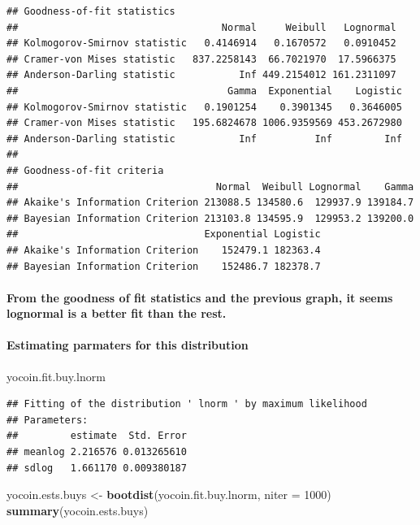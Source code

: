 \documentclass[]{article}
\newenvironment{Shaded}{\begin{snugshade}}{\end{snugshade}}
\newcommand{\KeywordTok}[1]{\textcolor[rgb]{0.13,0.29,0.53}{\textbf{#1}}}
\newcommand{\DataTypeTok}[1]{\textcolor[rgb]{0.13,0.29,0.53}{#1}}
\newcommand{\DecValTok}[1]{\textcolor[rgb]{0.00,0.00,0.81}{#1}}
\newcommand{\StringTok}[1]{\textcolor[rgb]{0.31,0.60,0.02}{#1}}
\newcommand{\NormalTok}[1]{#1}
\let\oldparagraph\paragraph
\renewcommand{\paragraph}[1]{\oldparagraph{#1}\mbox{}}
\begin{document}
\begin{verbatim}
## Goodness-of-fit statistics
##                                   Normal     Weibull   Lognormal
## Kolmogorov-Smirnov statistic   0.4146914   0.1670572   0.0910452
## Cramer-von Mises statistic   837.2258143  66.7021970  17.5966375
## Anderson-Darling statistic           Inf 449.2154012 161.2311097
##                                    Gamma  Exponential    Logistic
## Kolmogorov-Smirnov statistic   0.1901254    0.3901345   0.3646005
## Cramer-von Mises statistic   195.6824678 1006.9359569 453.2672980
## Anderson-Darling statistic           Inf          Inf         Inf
## 
## Goodness-of-fit criteria
##                                  Normal  Weibull Lognormal    Gamma
## Akaike's Information Criterion 213088.5 134580.6  129937.9 139184.7
## Bayesian Information Criterion 213103.8 134595.9  129953.2 139200.0
##                                Exponential Logistic
## Akaike's Information Criterion    152479.1 182363.4
## Bayesian Information Criterion    152486.7 182378.7
\end{verbatim}

\paragraph{From the goodness of fit statistics and the previous graph,
it seems lognormal is a better fit than the
rest.}\label{from-the-goodness-of-fit-statistics-and-the-previous-graph-it-seems-lognormal-is-a-better-fit-than-the-rest.-1}

\paragraph{Estimating parmaters for this
distribution}\label{estimating-parmaters-for-this-distribution-2}

\begin{Shaded}
\begin{Highlighting}[]
\NormalTok{yocoin.fit.buy.lnorm}
\end{Highlighting}
\end{Shaded}

\begin{verbatim}
## Fitting of the distribution ' lnorm ' by maximum likelihood 
## Parameters:
##         estimate  Std. Error
## meanlog 2.216576 0.013265610
## sdlog   1.661170 0.009380187
\end{verbatim}

\begin{Shaded}
\begin{Highlighting}[]
\NormalTok{yocoin.ests.buys <-}\StringTok{ }\KeywordTok{bootdist}\NormalTok{(yocoin.fit.buy.lnorm, }\DataTypeTok{niter =} \DecValTok{1000}\NormalTok{)}
\KeywordTok{summary}\NormalTok{(yocoin.ests.buys)}
\end{Highlighting}
\end{Shaded}
\end{document}
